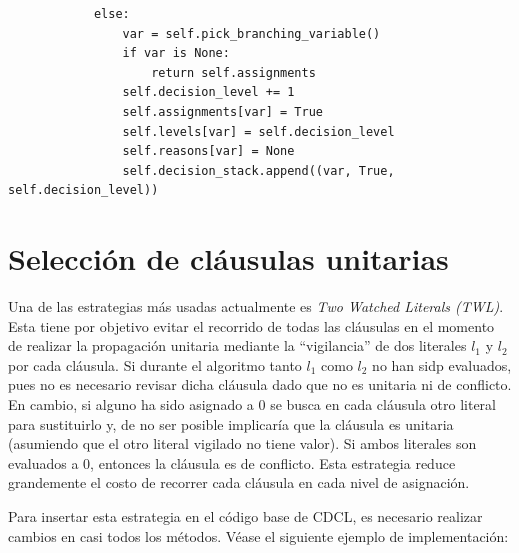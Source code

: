 \begin{lstlisting}
            else:
                var = self.pick_branching_variable()
                if var is None:
                    return self.assignments
                self.decision_level += 1
                self.assignments[var] = True
                self.levels[var] = self.decision_level
                self.reasons[var] = None
                self.decision_stack.append((var, True, self.decision_level))

\end{lstlisting}

\section{Selección de cláusulas unitarias}

Una de las estrategias más usadas actualmente es \textit{Two Watched Literals (TWL)}. Esta tiene por objetivo evitar el recorrido de todas las cláusulas en el momento de realizar la propagación unitaria mediante la ``vigilancia'' de dos literales $l_1$ y $l_2$ por cada cláusula. Si durante el algoritmo tanto $l_1$ como $l_2$ no han sidp evaluados, pues no es necesario revisar dicha cláusula dado que no es unitaria ni de conflicto. En cambio, si alguno ha sido asignado a 0 se busca en cada cláusula otro literal para sustituirlo y, de no ser posible implicaría que la cláusula es unitaria (asumiendo que el otro literal vigilado no tiene valor). Si ambos literales son evaluados a 0, entonces la cláusula es de conflicto. Esta estrategia reduce grandemente el costo de recorrer cada cláusula en cada nivel de asignación.

Para insertar esta estrategia en el código base de CDCL, es necesario realizar cambios en casi todos los métodos. Véase el siguiente ejemplo de implementación:

